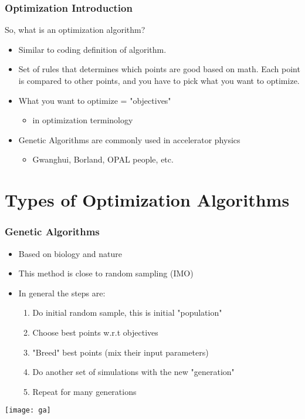 \documentclass{beamer}
\begin{document}
\begin{frame}
\frametitle{Optimization Introduction}
So, what is an optimization algorithm?
\begin{itemize}
	\item{Similar to coding definition of algorithm.} 
	\item{Set of rules that determines which points are good based on math. 
	Each point is compared to other points, and you have to pick what you want to optimize.}
	\item{What you want to optimize = "objectives"}
	\begin{itemize}
	\item{in optimization terminology}
	\end{itemize}
	\item{Genetic Algorithms are commonly used in accelerator physics}
	\begin{itemize}
		\item{Gwanghui, Borland, OPAL people, etc.}
	\end{itemize}
\end{itemize}

\end{frame}
\section{Types of Optimization Algorithms}
\begin{frame}
  \frametitle{Genetic Algorithms}
  \begin{itemize}
    \item{Based on biology and nature}
    \item{This method is close to random sampling (IMO)}
    \item{In general the steps are:}
    \begin{enumerate}
    	\item{Do initial random sample, this is initial "population"}
    	\item{Choose best points w.r.t objectives}
    	\item{"Breed" best points (mix their input parameters)}
    	\item{Do another set of simulations with the new "generation"}
    	\item{Repeat for many generations } 	
    \end{enumerate}
	\end{itemize}
\vspace*{-\baselineskip}
\begin{center}
	\texttt{[image: ga]}
\end{center}
\end{frame}
\end{document}
